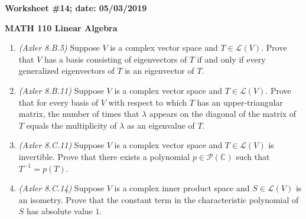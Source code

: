 \documentclass{article}
\newcommand{\CC}{\mathbb{C}}
\newcommand{\cL}{\mathcal{L}}
\begin{document}
{\bf Worksheet \#14; date: 05/03/2019}

{\bf MATH 110 Linear Algebra}

\begin{enumerate}
\item {\em (Axler 8.B.5)} Suppose $V$ is a complex vector space and $T \in \cL(V)$. Prove that $V$ has a basis consisting of eigenvectors of $T$ if and only if every generalized eigenvectors of $T$ is an eigenvector of $T$.

\item {\em (Axler 8.B.11)} Suppose $V$ is a complex vector space and $T \in \cL(V)$. Prove that for every basis of $V$ with respect to which $T$ has an upper-triangular matrix, the number of times that $\lambda$ appears on the diagonal of the matrix of $T$ equals the multiplicity of $\lambda$ as an eigenvalue of $T$.

\item {\em (Axler 8.C.11)} Suppose $V$ is a complex vector space and $T \in \cL(V)$ is invertible. Prove that there exists a polynomial $p \in \mathcal{P}(\CC)$ such that $T^{-1} = p(T)$.

\item {\em (Axler 8.C.14)} Suppose $V$ is a complex inner product space and $S \in \cL(V)$ is an isometry. Prove that the constant term in the characteristic polynomial of $S$ has absolute value $1$.

\end{enumerate}
\end{document}
